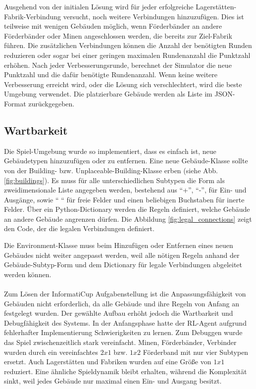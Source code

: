 Ausgehend von der initialen Lösung wird für jeder erfolgreiche Lagerstätten-Fabrik-Verbindung versucht, noch weitere Verbindungen hinzuzufügen. Dies ist teilweise mit wenigen Gebäuden möglich, wenn Förderbänder an andere Förderbänder oder Minen angeschlossen werden, die bereits zur Ziel-Fabrik führen. Die zusätzlichen Verbindungen können die Anzahl der benötigten Runden reduzieren oder sogar bei einer geringen maximalen Rundenanzahl die Punktzahl erhöhen. 
Nach jeder Verbesserungsrunde, berechnet der Simulator die neue Punktzahl und die dafür benötigte Rundenanzahl. Wenn keine weitere Verbesserung erreicht wird, oder die Lösung sich verschlechtert, wird die beste Umgebung verwendet. Die platzierbare Gebäude werden als Liste im JSON-Format zurückgegeben.

\subsection{Wartbarkeit}
Die Spiel-Umgebung wurde so implementiert, dass es einfach ist, neue Gebäudetypen hinzuzufügen oder zu entfernen. Eine neue Gebäude-Klasse sollte von der Building- bzw. Unplaceable-Building-Klasse erben (siehe Abb. \ref{fig:buildings}). Es muss für alle unterschiedlichen Subtypen die Form als zweidimensionale Liste angegeben werden, bestehend aus “+”, “-”, für Ein- und Ausgänge, sowie “ “ für freie Felder und einen beliebigen Buchstaben für inerte Felder. 
Über ein Python-Dictionary werden die Regeln definiert, welche Gebäude an andere Gebäude angrenzen dürfen. 
Die Abbildung \ref{fig:legal_connections} zeigt den Code, der die legalen Verbindungen definiert.

Die Environment-Klasse muss beim Hinzufügen oder Entfernen eines neuen Gebäudes nicht weiter angepasst werden, weil alle nötigen Regeln anhand der Gebäude-Subtyp-Form und dem Dictionary für legale Verbindungen abgeleitet werden können.
\\\\
Zum Lösen der InformatiCup Aufgabenstellung ist die Anpassungsfähigkeit von Gebäuden nicht erforderlich, da alle Gebäude und ihre Regeln von Anfang an festgelegt wurden. 
Der gewählte Aufbau erhöht jedoch die Wartbarkeit und Debugfähigkeit des Systems. 
In der Anfangsphase hatte der RL-Agent aufgrund fehlerhafter Implementierung Schwierigkeiten zu lernen. Zum Debuggen wurde das Spiel zwischenzeitlich stark vereinfacht. Minen, Förderbänder, Verbinder wurden durch ein vereinfachtes $2x1$ bzw. $1x2$ Förderband mit nur vier Subtypen ersetzt. Auch Lagerstätten und Fabriken wurden auf eine Größe von $1x1$ reduziert. Eine ähnliche Spieldynamik bleibt erhalten, während die Komplexität sinkt, weil jedes Gebäude nur maximal einen Ein- und Ausgang besitzt. 




